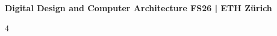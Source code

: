 \documentclass[8pt,landscape]{extarticle}
\begin{document}
{\large \textbf{Digital Design and Computer Architecture \hfill FS26 | ETH Zürich}}

\begin{multicols*}{4}

	
	
	
	
	

	\vfill\null
\end{multicols*}
\end{document}
